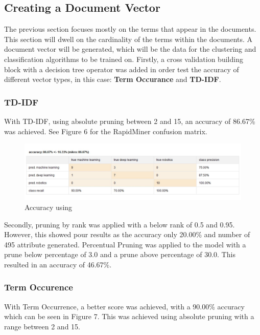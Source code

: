 \subsection*{Creating a Document Vector}
The previous section focuses mostly on the terms that appear in the documents. This section will dwell on the cardinality of the terms within the documents. A document vector will be generated, which will be the data for the clustering and classification algorithms to be trained on. Firstly, a cross validation building block with a decision tree operator was added in order test the accuracy of different vector types, in this case: \textbf{Term Occurance} and \textbf{TD-IDF}. \\ 


\subsubsection*{TD-IDF}
With TD-IDF, using absolute pruning between 2 and 15, an accuracy of 86.67\% was achieved. See Figure 6 for the RapidMiner confusion matrix.

\begin{figure}[ht]
	\begin{center}
		\advance\leftskip-3cm
		\advance\rightskip-3cm
		\includegraphics[keepaspectratio=true,scale=0.6]{__resources/tdidf.JPG}
		\caption{Accuracy using }
		\label{stop}
	\end{center}
\end{figure} 
\newpage

Secondly, pruning by rank was applied with a below rank of 0.5 and 0.95. However, this showed pour results as the accuracy only 20.00\% and number of 495 attribute generated.
Percentual Pruning was applied to the model with a prune below percentage of 3.0 and a prune above percentage of 30.0. This resulted in an accuracy of 46.67\%.

\subsubsection*{Term Occurence}
With Term Occurrence, a better score was achieved, with a 90.00\% accuracy which can be seen in Figure 7. This was achieved using absolute pruning with a range between 2 and 15.

